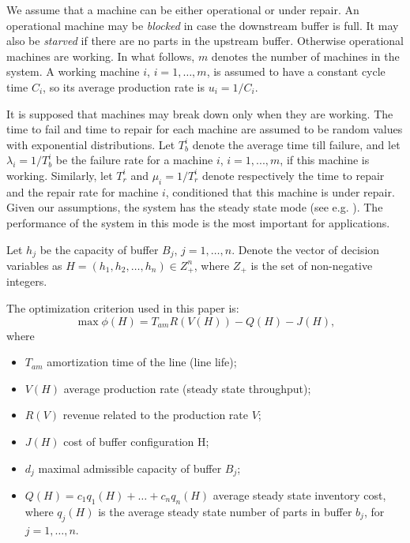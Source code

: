 \documentclass{ifacconf}
\begin{document}
We assume that a machine can be either operational or under 
repair. An operational machine may be {\em blocked} in case the  downstream  buffer is full.  
It  may  also  be  {\em starved}  if  there  are  no  parts in  the  upstream  buffer. Otherwise operational machines are working. In what 
follows, $m$ denotes the number of machines in the system. A working machine $i$, 
$i=1,\dots,m$, is assumed to have a constant cycle time $C_i$, so its average production 
rate is $u_i=1/C_i$. 

It is supposed that machines may break down only when they are working. The time to fail 
and  time  to  repair  for  each  machine  are  assumed  to  be  
random values with exponential distributions. Let $T_b^i$ denote the average time till failure, and let 
$\lambda_i=1/T_b^i$ be the failure rate for a machine $i$, $i=1,...,m$, if this machine is working. Similarly, let $T_r^i$ and $\mu_i=1/T_r^i$  
denote  respectively  the  time  to  repair  and  the repair rate for machine $i$, conditioned that this machine is under repair. Given our 
 assumptions,  the  system  has  the  steady  state  mode  (see  e.g. \cite{Seva62}).  The performance  of  the  system  in  this  mode  is  
 the most important  for 
applications.

Let $h_j$ be the capacity of buffer 
$B_j$, $j=1,\dots,n$.  Denote  the  vector  of  decision  variables  as  $H=  (h_1,  h_2,…, h_n )\in  Z_+^n$,  where  $Z_+$  is  the  set  of  non-negative  integers.  

The optimization criterion used in this paper is:
\begin{equation}
\label{criteria}
\max \phi(H)=T_{am} R(V(H)) - Q(H) - J(H),
\end{equation}
where 
\begin{itemize}
\item $T_{am}$  amortization time of the line (line life); 
\item $V(H)$  average production rate (steady state throughput); 
\item $R(V)$  revenue related to the production rate $V$; 
\item $J(H)$ cost of buffer configuration H; 
\item $d_j$ maximal admissible capacity of buffer $B_j$;
\item $Q(H)= c_1q_1(H)+ …+c_n q_n(H)$ average steady state inventory cost, where $q_j(H)$ is the average steady state number of parts in buffer $b_j$, for $j=1,…,n$.
\end{itemize}
\end{document}
